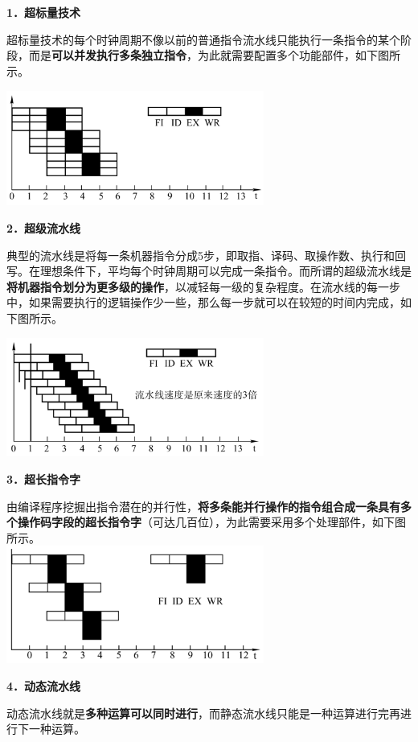 {\textbf{1．超标量技术}}

超标量技术的每个时钟周期不像以前的普通指令流水线只能执行一条指令的某个阶段，而是\textbf{可以并发执行多条独立指令}，为此就需要配置多个功能部件，如下图所示。

\includegraphics[width=3.33333in,height=1.48958in]{png-jpeg-pics/70CCDEFF7D2922032E9EC5783A4F7AF9.png}

{\textbf{2．超级流水线}}

典型的流水线是将每一条机器指令分成5步，即取指、译码、取操作数、执行和回写。在理想条件下，平均每个时钟周期可以完成一条指令。而所谓的超级流水线是\textbf{将机器指令划分为更多级的操作}，以减轻每一级的复杂程度。在流水线的每一步中，如果需要执行的逻辑操作少一些，那么每一步就可以在较短的时间内完成，如下图所示。

\includegraphics[width=3.33333in,height=1.54167in]{png-jpeg-pics/0E0DE9C31F4E78B16AF9BAA8C5D4D0D3.png}

{\textbf{3．超长指令字}}

由编译程序挖掘出指令潜在的并行性，\textbf{将多条能并行操作的指令组合成一条具有多个操作码字段的超长指令字}（可达几百位），为此需要采用多个处理部件，如下图所示。\\
\includegraphics[width=3.33333in,height=1.52083in]{png-jpeg-pics/387B07E477E1BD300EECA9B68FAB749D.png}

{\textbf{4．动态流水线}}

动态流水线就是\textbf{多种运算可以同时进行}，而静态流水线只能是一种运算进行完再进行下一种运算。
